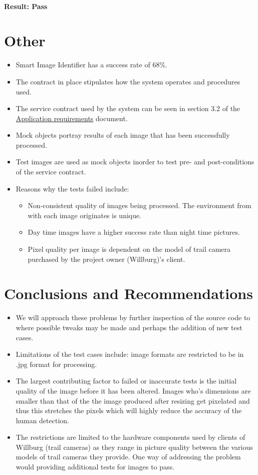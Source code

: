 \documentclass[a4paper,12pt]{report}
\begin{document}
		\paragraph{Result: Pass}
		
	\section{Other}
		\begin {itemize}
			\item Smart Image Identifier has a success rate of 68\%.
			\item The contract in place stipulates how the system operates and procedures used.
			\item The service contract used by the system can be seen in section 3.2 of the \href{https://github.com/StephenSwanepoel/Ambitious-Designs/blob/master/Architecture\%20Requirements/doc1.pdf}{Application requirements}  document. 
			\item Mock objects portray results of each image that has been successfully processed.
			\item Test images are used as mock objects inorder to test pre- and post-conditions of the service contract.
			\item Reasons why the tests failed include:
			\begin{itemize}
				\item Non-consistent quality of images being processed. The environment from with each image originates is unique.
				\item Day time images have a higher success rate than night time pictures.
				\item Pixel quality per image is dependent on the model of trail camera purchased by the project owner (Willburg)'s client.
			\end{itemize}
		\end {itemize}
\newpage		
	\section{Conclusions and Recommendations}
		\begin {itemize}
			\item We will approach these problems by further inspection of the source code to where possible tweaks may be made and perhaps the addition of new test cases.
			\item Limitations of the test cases include: image formats are restricted to be in .jpg format for processing.
			\item The largest contributing factor to failed or inaccurate tests is the initial quality of the image before it has been altered. Images who's dimensions are smaller than that of the the image produced after resizing get pixelated and thus this stretches the pixels which will highly reduce the accuracy of the human detection.			
			\item The restrictions are limited to the hardware components used by clients of Willburg (trail cameras) as they range in picture quality between the various models of trail cameras they provide. One way of addressing the problem would providing additional tests for images to pass.
		\end {itemize}
\end{document}
